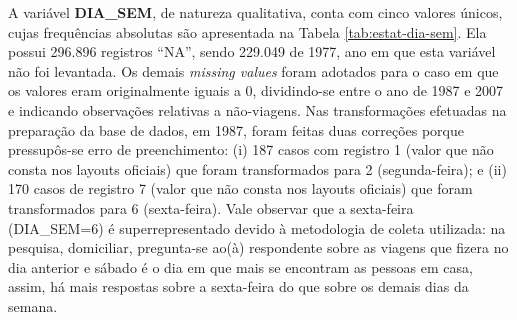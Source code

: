 \begin{table}[htb]
\centering

\end{table}

A variável \textbf{DIA_SEM}, de natureza qualitativa, conta com cinco valores únicos, cujas frequências absolutas são apresentada na Tabela \ref{tab:estat-dia-sem}. 
Ela possui 296.896 registros ``NA'', sendo 229.049 de 1977, ano em que esta variável não foi levantada. Os demais \textit{missing values} foram adotados para o caso em que os valores eram originalmente iguais a 0, dividindo-se entre o ano de 1987 e 2007 e indicando observações relativas a não-viagens. Nas transformações efetuadas na preparação da base de dados, em 1987, foram feitas duas correções porque pressupôs-se erro de preenchimento: (i) 187 casos com registro 1 (valor que não consta nos layouts oficiais) que foram transformados para 2 (segunda-feira); e (ii) 170 casos de registro 7 (valor que não consta nos layouts oficiais) que foram transformados para 6 (sexta-feira).
 Vale observar que a sexta-feira (DIA_SEM=6) é superrepresentado devido à metodologia de coleta utilizada: na pesquisa, domiciliar, pregunta-se ao(à) respondente sobre as viagens que fizera no dia anterior e sábado é o dia em que mais se encontram as pessoas em casa, assim, há mais respostas sobre a sexta-feira do que sobre os demais dias da semana.

